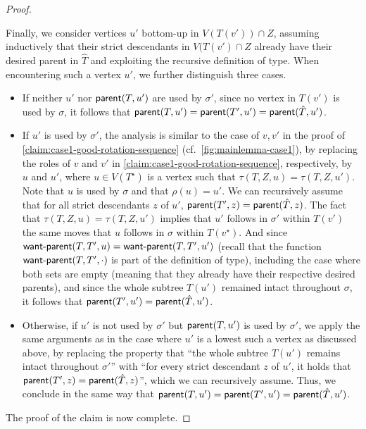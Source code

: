 \documentclass[a4paper,UKenglish,cleveref, autoref, thm-restate]{lipics-v2021}
\newenvironment{cproof}{\proof[Proof of claim]\renewcommand\qedsymbol{$\diamond$}}{\endproof}
\newcommand{\parent}{{\sf parent}\xspace}
\newcommand{\wantparent}{{\sf {\sf want{\text -}parent}}\xspace}
\begin{document}
\begin{proof}
\begin{cproof}
\begin{itemize}
Finally, we consider vertices $u'$ bottom-up in $V(T(v')) \cap Z$, assuming inductively that their strict descendants in $V(T(v') \cap Z$ already have their desired parent in $\hat{T}$ and exploiting the recursive definition of type. When encountering such a vertex $u'$, we further distinguish three cases.

\begin{itemize}
  \item If neither $u'$ nor $\parent(T,u')$ are used by $\sigma'$, since no vertex in $T(v')$ is used by $\sigma$, it follows that $\parent(T,u')= \parent(T',u') = \parent(\hat{T},u')$.
  \item If $u'$ is used by $\sigma'$, the analysis is similar to the case of $v,v'$ in the proof of \autoref{claim:case1-good-rotation-sequence} (cf.~\autoref{fig:mainlemma-case1}), by replacing the roles of $v$ and $v'$ in \autoref{claim:case1-good-rotation-sequence}, respectively, by $u$ and $u'$, where $u \in V(T^{\star})$ is a vertex such that $\tau(T,Z,u)=\tau(T,Z,u')$. Note that $u$ is used by $\sigma$ and that $\rho(u)=u'$. We can recursively assume that for all strict descendants $z$ of $u'$, $\parent(T',z) = \parent(\hat{T},z)$. The fact that $\tau(T,Z,u) = \tau(T,Z,u')$ implies that $u'$ follows in $\sigma'$ within $T(v')$ the same moves that $u$ follows in $\sigma$ within $T(v^{\star})$. And since $\wantparent(T,T',u) = \wantparent(T,T',u')$ (recall that the function $\wantparent(T,T',\cdot)$ is part of the definition of type), including the case where both sets are empty (meaning that they already have their respective desired parents), and since the whole subtree $T(u')$ remained intact throughout $\sigma$,
      it follows that $\parent(T',u') = \parent(\hat{T},u')$.

 \item Otherwise, if $u'$ is not used by $\sigma'$ but $\parent(T,u')$ is used by $\sigma'$, we apply the same arguments as in the case where $u'$ is a lowest such a vertex as discussed above, by replacing the property that ``the whole subtree $T(u')$ remains intact throughout $\sigma'$'' with ``for every strict descendant $z$ of $u'$, it holds that $\parent(T',z) = \parent(\hat{T},z)$'', which we can recursively assume. Thus, we conclude in the same way that $\parent(T,u') = \parent(T',u') = \parent(\hat{T},u')$.
\end{itemize}
\end{itemize}
The proof of the claim is now complete.
\end{cproof}


\end{proof}
\end{document}
